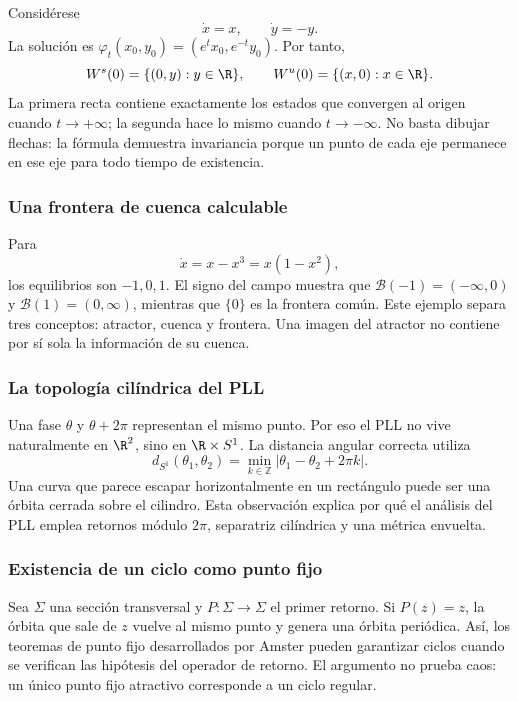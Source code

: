 Considérese
\begin{equation}
 \dot x=x,\qquad \dot y=-y.
 \label{eq:guide-linear-saddle}
\end{equation}
La solución es $\varphi_t(x_0,y_0)=(e^t x_0,e^{-t}y_0)$. Por tanto,
\[
 W^s(0)=\{(0,y):y\in\R\},\qquad
 W^u(0)=\{(x,0):x\in\R\}.
\]
La primera recta contiene exactamente los estados que convergen al origen
cuando $t\to+\infty$; la segunda hace lo mismo cuando $t\to-\infty$. No basta
dibujar flechas: la fórmula demuestra invariancia porque un punto de cada eje
permanece en ese eje para todo tiempo de existencia.

\subsubsection{Una frontera de cuenca calculable}

Para
\begin{equation}
 \dot x=x-x^3=x(1-x^2),
 \label{eq:guide-bistable-line}
\end{equation}
los equilibrios son $-1,0,1$. El signo del campo muestra que
$\mathcal B(-1)=(-\infty,0)$ y $\mathcal B(1)=(0,\infty)$, mientras que
$\{0\}$ es la frontera común. Este ejemplo separa tres conceptos: atractor,
cuenca y frontera. Una imagen del atractor no contiene por sí sola la
información de su cuenca.

\subsubsection{La topología cilíndrica del PLL}

Una fase $\theta$ y $\theta+2\pi$ representan el mismo punto. Por eso el PLL
no vive naturalmente en $\R^2$, sino en $\R\times S^1$. La distancia angular
correcta utiliza
\begin{equation}
 d_{S^1}(\theta_1,\theta_2)
 =\min_{k\in\mathbb Z}|\theta_1-\theta_2+2\pi k|.
 \label{eq:guide-circle-distance}
\end{equation}
Una curva que parece escapar horizontalmente en un rectángulo puede ser una
órbita cerrada sobre el cilindro. Esta observación explica por qué el
análisis del PLL emplea retornos módulo $2\pi$, separatriz cilíndrica y una
métrica envuelta.

\subsubsection{Existencia de un ciclo como punto fijo}

Sea $\Sigma$ una sección transversal y $P:\Sigma\to\Sigma$ el primer retorno.
Si $P(z)=z$, la órbita que sale de $z$ vuelve al mismo punto y genera una
órbita periódica. Así, los teoremas de punto fijo desarrollados por Amster pueden
garantizar ciclos cuando se verifican las hipótesis del operador de retorno.
El argumento no prueba caos: un único punto fijo atractivo corresponde a un
ciclo regular.

